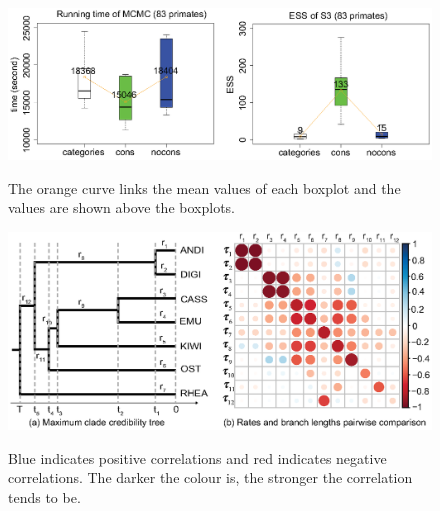 \documentclass{bmcart}
\begin{document}
\begin{backmatter}
\begin{figure}[h!]
\includegraphics[width=12cm]{Fig15-primates.eps}\\
\caption{
             The orange curve links the mean values of each boxplot and the values are shown above the boxplots.}
\label{eff_comp2}
\end{figure}

\begin{figure}[h!]
\includegraphics[width=12cm]{Fig16-correlation.eps}\\
\caption{
             Blue indicates positive correlations and red indicates negative correlations. The darker the colour is, the stronger the correlation tends to be.}
\label{correlation}
\end{figure}


\end{backmatter}
\end{document}
